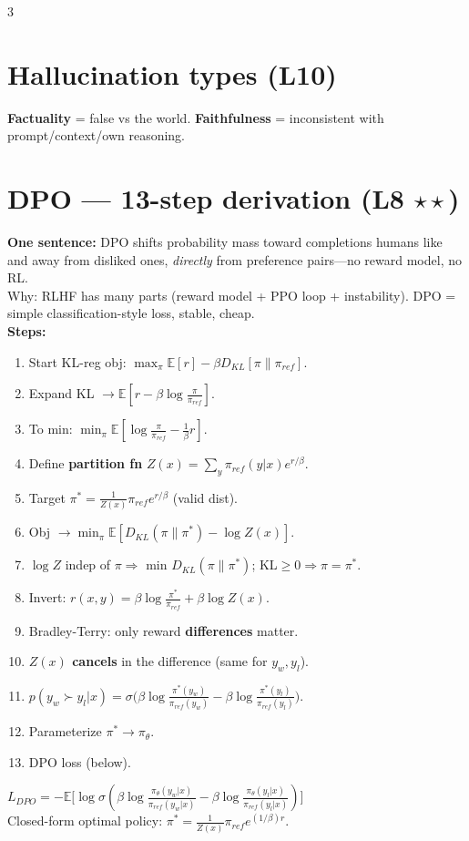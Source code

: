 \documentclass[12pt]{extarticle} %
\newcommand{\sub}[1]{\textcolor{key}{\textbf{#1}}}
\newcommand{\fb}[1]{\colorbox{yellow!30}{$#1$}} %
\begin{document}
\begin{multicols}{3}
\section{Hallucination types \textnormal{(L10)}}
\sub{Factuality} = false vs the world. \sub{Faithfulness} = inconsistent with prompt/context/own reasoning.

\section{DPO — 13-step derivation \textnormal{(L8 \(\star\star\))}}
\sub{One sentence:} DPO shifts probability mass toward completions humans like and away from disliked ones, \emph{directly} from preference pairs—no reward model, no RL.\\
Why: RLHF has many parts (reward model + PPO loop + instability). DPO = simple classification-style loss, stable, cheap.\\
\textbf{Steps:}
\begin{enumerate}[leftmargin=1.3em,itemsep=0pt]
\item Start KL-reg obj: $\max_\pi \mathbb E[r]-\beta D_{KL}[\pi\|\pi_{ref}]$.
\item Expand KL $\to \mathbb E[r-\beta\log\tfrac{\pi}{\pi_{ref}}]$.
\item To min: $\min_\pi \mathbb E[\log\tfrac{\pi}{\pi_{ref}}-\tfrac1\beta r]$.
\item Define \sub{partition fn} $Z(x)=\sum_y \pi_{ref}(y|x)e^{r/\beta}$.
\item Target $\pi^*=\tfrac1{Z(x)}\pi_{ref}e^{r/\beta}$ (valid dist).
\item Obj $\to \min_\pi \mathbb E[D_{KL}(\pi\|\pi^*)-\log Z(x)]$.
\item $\log Z$ indep of $\pi\Rightarrow$ min $D_{KL}(\pi\|\pi^*)$; KL$\ge0\Rightarrow \pi=\pi^*$.
\item Invert: $r(x,y)=\beta\log\tfrac{\pi^*}{\pi_{ref}}+\beta\log Z(x)$.
\item Bradley-Terry: only reward \sub{differences} matter.
\item \sub{$Z(x)$ cancels} in the difference (same for $y_w,y_l$).
\item $p(y_w\!\succ\!y_l|x)=\sigma\!\big(\beta\log\tfrac{\pi^*(y_w)}{\pi_{ref}(y_w)}-\beta\log\tfrac{\pi^*(y_l)}{\pi_{ref}(y_l)}\big)$.
\item Parameterize $\pi^*\!\to\!\pi_\theta$.
\item DPO loss (below).
\end{enumerate}
\fb{L_{DPO}=-\mathbb E\big[\log\sigma(\beta\log\tfrac{\pi_\theta(y_w|x)}{\pi_{ref}(y_w|x)}-\beta\log\tfrac{\pi_\theta(y_l|x)}{\pi_{ref}(y_l|x)})\big]}\\
Closed-form optimal policy: $\pi^*=\tfrac1{Z(x)}\pi_{ref}e^{(1/\beta)r}$.


\end{multicols}
\end{document}
